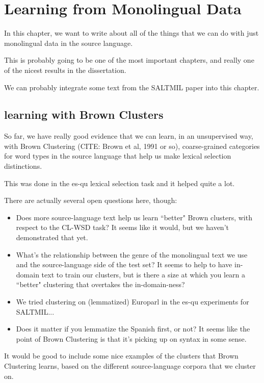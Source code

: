 \chapter{Learning from Monolingual Data}
\label{chap:monolingual}

In this chapter, we want to write about all of the things that we can do with
just monolingual data in the source language.

This is probably going to be one of the most important chapters, and really one
of the nicest results in the dissertation.

We can probably integrate some text from the SALTMIL paper into this chapter.

\section{learning with Brown Clusters}
So far, we have really good evidence that we can learn, in an unsupervised way,
with Brown Clustering (CITE: Brown et al, 1991 or so),
coarse-grained categories for word types in the source language that help us
make lexical selection distinctions.

This was done in the es-qu lexical selection task and it helped quite a lot.

There are actually several open questions here, though:

\begin{itemize}
  \item Does more source-language text help us learn ``better" Brown clusters,
    with respect to the CL-WSD task? It seems like it would, but we haven't
    demonstrated that yet.
  \item What's the relationship between the genre of the monolingual text we
    use and the source-language side of the test set? It seems to help to have
    in-domain text to train our clusters, but is there a size at which you
    learn a ``better" clustering that overtakes the in-domain-ness?
  \item We tried clustering on (lemmatized) Europarl in the es-qu experiments for SALTMIL...
  \item Does it matter if you lemmatize the Spanish first, or not? It seems
    like the point of Brown Clustering is that it's picking up on syntax in
    some sense.
\end{itemize}

It would be good to include some nice examples of the clusters that Brown
Clustering learns, based on the different source-language corpora that we
cluster on.

